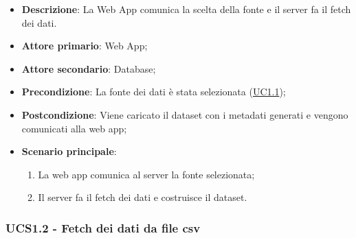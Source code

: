 \begin{itemize}

	\item \textbf{Descrizione}: La Web App comunica la scelta della fonte e il server fa il fetch dei dati.
	
    \item \textbf{Attore primario}: Web App;
	\item \textbf{Attore secondario}: Database;
        
    \item \textbf{Precondizione}:   La fonte dei dati è stata selezionata (\hyperref[ssub:uc1.1]{UC1.1});

    \item \textbf{Postcondizione}:  Viene caricato il dataset con i metadati generati e vengono comunicati alla web app;

	\item \textbf{Scenario principale}:
		\begin{enumerate}
			\item La web app comunica al server la fonte selezionata;
            \item Il server fa il fetch dei dati e costruisce il dataset.
        \end{enumerate}
	
\end{itemize}


\subsubsection{UCS1.2 - Fetch dei dati da file csv}
\label{ssub:ucs1.2}

